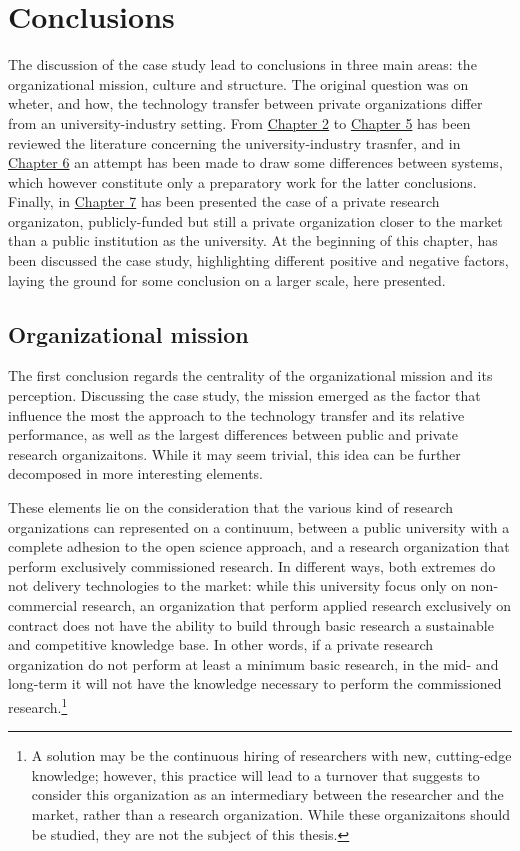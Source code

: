 \section{Conclusions}

The discussion of the case study lead to conclusions in three main areas: the organizational mission, culture and structure. The original question was on wheter, and how, the technology transfer between private organizations differ from an university-industry setting. From \hyperref[Chapter2]{Chapter 2} to \hyperref[Chapter5]{Chapter 5} has been reviewed the literature concerning the university-industry trasnfer, and in \hyperref[Chapter6]{Chapter 6} an attempt has been made to draw some differences between systems, which however constitute only a preparatory work for the latter conclusions. Finally, in \hyperref[Chapter7]{Chapter 7} has been presented the case of a private research organizaton, publicly-funded but still a private organization closer to the market than a public institution as the university. At the beginning of this chapter, has been discussed the case study, highlighting different positive and negative factors, laying the ground for some conclusion on a larger scale, here presented.

\subsection{Organizational mission}

The first conclusion regards the centrality of the organizational mission and its perception. Discussing the case study, the mission emerged as the factor that influence the most the approach to the technology transfer and its relative performance, as well as the largest differences between public and private research organizaitons. While it may seem trivial, this idea can be further decomposed in more interesting elements.

These elements lie on the consideration that the various kind of research organizations can represented on a continuum, between a public university with a complete adhesion to the open science approach, and a research organization that perform exclusively commissioned research. In different ways, both extremes do not delivery technologies to the market: while this university focus only on non-commercial research, an organization that perform applied research exclusively on contract does not have the ability to build through basic research a sustainable and competitive knowledge base. In other words, if a private research organization do not perform at least a minimum basic research, in the mid- and long-term it will not have the knowledge necessary to perform the commissioned research.\footnote{A solution may be the continuous hiring of researchers with new, cutting-edge knowledge; however, this practice will lead to a turnover that suggests to consider this organization as an intermediary between the researcher and the market, rather than a research organization. While these organizaitons should be studied, they are not the subject of this thesis.}


